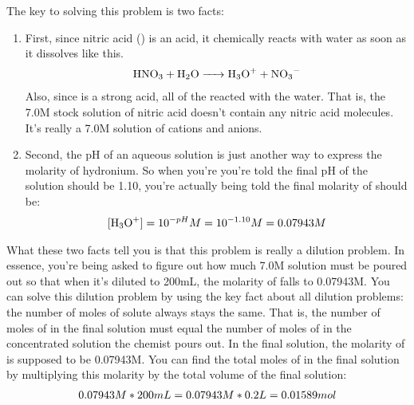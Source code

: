 \documentclass{article}  %
\begin{document}
The key to solving this problem is two facts:
\begin{enumerate}
    \item First, since nitric acid () is an acid, it chemically reacts with water as soon as it dissolves like this.
    \begin{equation*}
        \begin{aligned}
            \ce{HNO3 + H2O -> H3O+ + NO3-}
        \end{aligned}
    \end{equation*}
    Also, since  is a strong acid, all of the  reacted with the water. That is, the 7.0M stock solution of nitric acid doesn't contain any nitric acid molecules. It's really a 7.0M solution of  cations and  anions.
    \item Second, the pH of an aqueous solution is just another way to express \ce{[H3O+]} the molarity of hydronium. So when you're you're told the final pH of the solution should be 1.10, you're actually being told the final molarity of  should be:
    \begin{equation*}
        \begin{aligned}
            \ce{[H3O+]} = 10^{-pH}M = 10^{-1.10}M = 0.07943M
        \end{aligned}
    \end{equation*}
\end{enumerate}
What these two facts tell you is that this problem is really a dilution problem. In essence, you're being asked to figure out how much 7.0M  solution must be poured out so that when it's diluted to 200mL, the molarity of  falls to 0.07943M. 
\newline
\newline
You can solve this dilution problem by using the key fact about all dilution problems: the number of moles of solute always stays the same. That is, the number of moles of  in the final solution must equal the number of moles of  in the concentrated solution the chemist pours out. 
\newline
\newline
In the final solution, the molarity of  is supposed to be 0.07943M. You can find the total moles of  in the final solution by multiplying this molarity by the total volume of the final solution:
\begin{equation*}
    \begin{aligned}
        0.079\newline43M * 200mL = 0.07943M * 0.2L = 0.01589mol
    \end{aligned}
\end{equation*}
\end{document}

